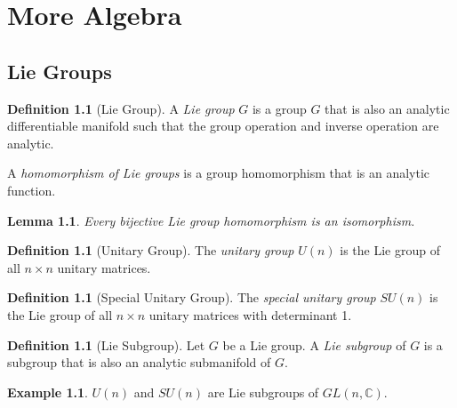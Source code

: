 \documentclass{book}
\newtheorem{lm}[prop]{Lemma}
\theoremstyle{definition}
\newtheorem{df}[prop]{Definition}
\newtheorem{ex}[prop]{Example}
\begin{document}
\part{More Algebra}

\chapter{Lie Groups}

\begin{df}[Lie Group]
A \emph{Lie group} $G$ is a group $G$ that is also an analytic differentiable manifold such that the group operation and inverse operation are analytic.

A \emph{homomorphism of Lie groups} is a group homomorphism that is an analytic function.
\end{df}

\begin{lm}
Every bijective Lie group homomorphism is an isomorphism.
\end{lm}


\begin{df}[Unitary Group]
The \emph{unitary group} $U(n)$ is the Lie group of all $n \times n$ unitary matrices.
\end{df}

\begin{df}[Special Unitary Group]
The \emph{special unitary group} $SU(n)$ is the Lie group of all $n \times n$ unitary matrices with determinant 1.
\end{df}

\begin{df}[Lie Subgroup]
Let $G$ be a Lie group. A \emph{Lie subgroup} of $G$ is a subgroup that is also an analytic submanifold of $G$.
\end{df}

\begin{ex}
$U(n)$ and $SU(n)$ are Lie subgroups of $GL(n, \mathbb{C})$.
\end{ex}
\end{document}
